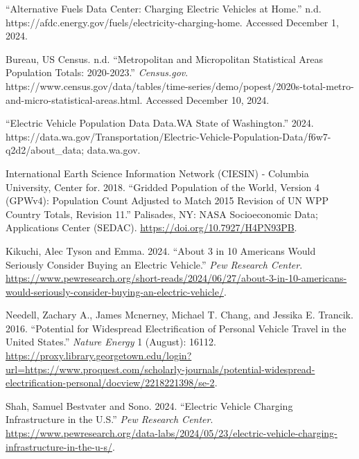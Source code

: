 \documentclass[
  letterpaper,
  DIV=11,
  numbers=noendperiod]{scrartcl}
\newlength{\cslhangindent}
\newenvironment{CSLReferences}[2] %
 {\begin{list}{}{%
  \setlength{\itemindent}{0pt}
  \setlength{\leftmargin}{0pt}
  \setlength{\parsep}{0pt}
  \ifodd #1
   \setlength{\leftmargin}{\cslhangindent}
   \setlength{\itemindent}{-1\cslhangindent}
  \fi
  \setlength{\itemsep}{#2\baselineskip}}}
 {\end{list}}
\begin{document}
\label{refs}
\begin{CSLReferences}{1}{0}
{``Alternative {Fuels Data Center}: {Charging Electric Vehicles} at
{Home}.''} n.d. https://afdc.energy.gov/fuels/electricity-charging-home.
Accessed December 1, 2024.

Bureau, US Census. n.d. {``Metropolitan and {Micropolitan Statistical
Areas Population Totals}: 2020-2023.''} \emph{Census.gov}.
https://www.census.gov/data/tables/time-series/demo/popest/2020s-total-metro-and-micro-statistical-areas.html.
Accessed December 10, 2024.

{``Electric {Vehicle Population Data} {\textbar} {Data}.{WA} {\textbar}
{State} of {Washington}.''} 2024.
https://data.wa.gov/Transportation/Electric-Vehicle-Population-Data/f6w7-q2d2/about\_data;
data.wa.gov.

International Earth Science Information Network (CIESIN) - Columbia
University, Center for. 2018. {``Gridded Population of the World,
Version 4 (GPWv4): Population Count Adjusted to Match 2015 Revision of
UN WPP Country Totals, Revision 11.''} Palisades, NY: NASA Socioeconomic
Data; Applications Center (SEDAC).
\url{https://doi.org/10.7927/H4PN93PB}.

Kikuchi, Alec Tyson and Emma. 2024. {``About 3 in 10 {Americans} Would
Seriously Consider Buying an Electric Vehicle.''} \emph{Pew Research
Center}.
\url{https://www.pewresearch.org/short-reads/2024/06/27/about-3-in-10-americans-would-seriously-consider-buying-an-electric-vehicle/}.

Needell, Zachary A., James Mcnerney, Michael T. Chang, and Jessika E.
Trancik. 2016. {``Potential for Widespread Electrification of Personal
Vehicle Travel in the United States.''} \emph{Nature Energy} 1 (August):
16112.
\url{https://proxy.library.georgetown.edu/login?url=https://www.proquest.com/scholarly-journals/potential-widespread-electrification-personal/docview/2218221398/se-2}.

Shah, Samuel Bestvater and Sono. 2024. {``Electric {Vehicle Charging
Infrastructure} in the {U}.{S}.''} \emph{Pew Research Center}.
\url{https://www.pewresearch.org/data-labs/2024/05/23/electric-vehicle-charging-infrastructure-in-the-u-s/}.

\end{CSLReferences}
\end{document}
